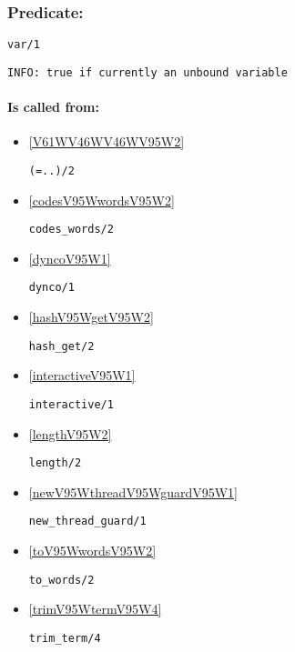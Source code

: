 \subsubsection{Predicate:} \label{varV95W1}

\begin{verbatim}
var/1
\end{verbatim}

{\small \begin{verbatim}
INFO: true if currently an unbound variable

\end{verbatim}}
\paragraph{Is called from:} 
\begin{itemize}
\item \ref{V61WV46WV46WV95W2} 
\begin{verbatim}
(=..)/2
\end{verbatim}

\item \ref{codesV95WwordsV95W2} 
\begin{verbatim}
codes_words/2
\end{verbatim}

\item \ref{dyncoV95W1} 
\begin{verbatim}
dynco/1
\end{verbatim}

\item \ref{hashV95WgetV95W2} 
\begin{verbatim}
hash_get/2
\end{verbatim}

\item \ref{interactiveV95W1} 
\begin{verbatim}
interactive/1
\end{verbatim}

\item \ref{lengthV95W2} 
\begin{verbatim}
length/2
\end{verbatim}

\item \ref{newV95WthreadV95WguardV95W1} 
\begin{verbatim}
new_thread_guard/1
\end{verbatim}

\item \ref{toV95WwordsV95W2} 
\begin{verbatim}
to_words/2
\end{verbatim}

\item \ref{trimV95WtermV95W4} 
\begin{verbatim}
trim_term/4
\end{verbatim}

\end{itemize}

